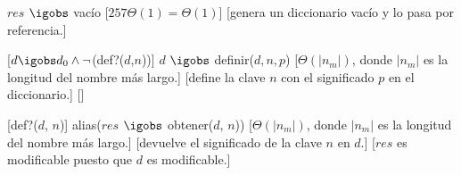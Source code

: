 \begin{Interfaz}




  {$res$ $\igobs$ vacío}%
  [$257\Theta(1) = \Theta(1)$]
  [genera un diccionario vacío y lo pasa por referencia.]

  [$d \igobs d_0 \land \lnot$(def?($d$,$n$))]
  {$d$ $\igobs$ definir($d, n, p$)}
  [$\displaystyle\Theta\left(|n_{m}|\right)$, donde $|n_{m}|$ es la longitud del nombre más largo.]
  [define la clave $n$ con el significado $p$ en el diccionario.]
  []

  [def?($d$, $n$)]
  {alias($res$ $\igobs$ obtener($d$, $n$))}
  [$\Theta(|n_{m}|)$, donde $|n_{m}|$ es la longitud del nombre más largo.]
  [devuelve el significado de la clave $n$ en $d$.]
  [$res$ es modificable puesto que $d$ es modificable.]


\end{Interfaz}

